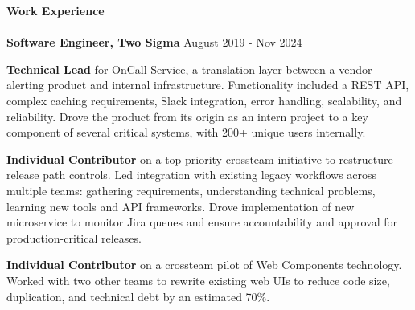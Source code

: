 \documentclass[12pt]{article}
\begin{document}
\begin{flushleft}
    \begin{outline}[compactitem]

        \newlength{\upspacelength}
        \setlength{\upspacelength}{-0.6px}
        \newcommand{\upspace}{\vspace{\upspacelength}}
        \newcommand{\zzz}[1]{\upspace \0 \textbf{#1} \\ \vspace{-0.8\baselineskip} \hrulefill \vspace{-2px} \\ }

        \zzz{Work Experience}
        \vspace{0.25em}
          \1 \textbf{Software Engineer, Two Sigma} \hfill August 2019 - Nov 2024

          \vspace{0.25em}\textbf{Technical Lead} for OnCall Service, a translation layer between a vendor alerting product and internal infrastructure.
          Functionality included a REST API, complex caching requirements, Slack integration, error handling, scalability, and reliability.
          Drove the product from its origin as an intern project to a key component of several critical systems, with 200+ unique users internally.

          \vspace{0.25em}\textbf{Individual Contributor} on a top-priority crossteam initiative to restructure release path controls.
          Led integration with existing legacy workflows across multiple teams:
          gathering requirements, understanding technical problems, learning new tools and API frameworks.
          Drove implementation of new microservice to monitor Jira queues and ensure accountability and approval for production-critical releases.

          \vspace{0.25em}\textbf{Individual Contributor} on a crossteam pilot of Web Components technology.
          Worked with two other teams to rewrite existing web UIs to reduce code size, duplication, and technical debt by an estimated 70\%.


\end{outline}
\end{flushleft}
\end{document}
